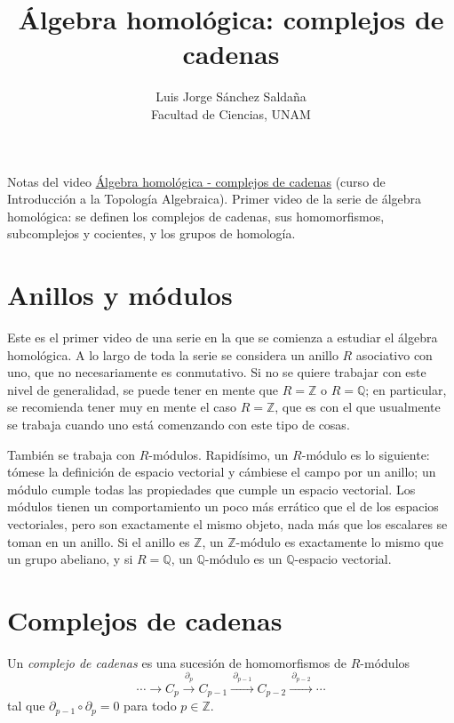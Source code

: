 \documentclass[11pt]{article}
\title{Álgebra homológica: complejos de cadenas}
\author{Luis Jorge Sánchez Saldaña\\[2pt]\small Facultad de Ciencias, UNAM}
\date{}
\begin{document}
\maketitle

\noindent\small Notas del video
\href{https://www.youtube.com/watch?v=S0zOYyqNOCw}{\guillemotleft{}Álgebra homológica - complejos de cadenas\guillemotright{}}
(curso de Introducción a la Topología Algebraica). Primer video de la serie de álgebra homológica: se definen los complejos de cadenas, sus homomorfismos, subcomplejos y cocientes, y los grupos de homología.
\normalsize

\section*{Anillos y módulos}

Este es el primer video de una serie en la que se comienza a estudiar el álgebra homológica. A lo largo de toda la serie se considera un anillo $R$ asociativo con uno, que no necesariamente es conmutativo. Si no se quiere trabajar con este nivel de generalidad, se puede tener en mente que $R=\mathbb Z$ o $R=\mathbb Q$; en particular, se recomienda tener muy en mente el caso $R=\mathbb Z$, que es con el que usualmente se trabaja cuando uno está comenzando con este tipo de cosas.

También se trabaja con $R$-módulos. Rapidísimo, un $R$-módulo es lo siguiente: tómese la definición de espacio vectorial y cámbiese el campo por un anillo; un módulo cumple todas las propiedades que cumple un espacio vectorial. Los módulos tienen un comportamiento un poco más errático que el de los espacios vectoriales, pero son exactamente el mismo objeto, nada más que los escalares se toman en un anillo. Si el anillo es $\mathbb Z$, un $\mathbb Z$-módulo es exactamente lo mismo que un grupo abeliano, y si $R=\mathbb Q$, un $\mathbb Q$-módulo es un $\mathbb Q$-espacio vectorial.

\section*{Complejos de cadenas}

\begin{defn}\label{def:complejo}
Un \emph{complejo de cadenas} es una sucesión de homomorfismos de $R$-módulos
\[
  \cdots\longrightarrow C_p\xrightarrow{\ \partial_p\ }C_{p-1}\xrightarrow{\ \partial_{p-1}\ }C_{p-2}\xrightarrow{\ \partial_{p-2}\ }\cdots
\]
tal que $\partial_{p-1}\circ\partial_p=0$ para todo $p\in\mathbb Z$.
\end{defn}
\end{document}
